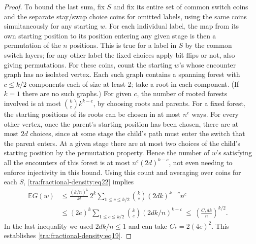 \begin{proof}
To bound the last sum, fix \(S\) and fix its entire set of common switch coins and the separate stay/swap choice coins for omitted labels, using the same coins simultaneously for any starting \(w\). For each individual label, the map from its own starting position to its position entering any given stage is then a permutation of the \(n\) positions. This is true for a label in \(S\) by the common switch layers; for any other label the fixed choices apply bit flips or not, also giving permutations. For these coins, count the starting \(w\)'s whose encounter graph has no isolated vertex. Each such graph contains a spanning forest with \(c\le k/2\) components each of size at least 2; take a root in each component. (If \(k=1\) there are no such graphs.) For given \(c\), the number of rooted forests involved is at most
\(\binom{k}{c} k^{k-c}\), by choosing roots and parents. For a fixed forest, the starting positions of its roots can be chosen in at most \(n^c\) ways. For every other vertex, once the parent's starting position has been chosen, there are at most \(2d\) choices, since at some stage the child's path must enter the switch that the parent enters. At a given stage there are at most two choices of the child's starting position by the permutation property. Hence the number of \(w\)'s satisfying all the encounters of this forest is at most \(n^c(2d)^{k-c}\), not even needing to enforce injectivity in this bound. Using this count and averaging over coins for each \(S\), \eqref{tra:fractional-density:eq22} implies
\[
 \begin{aligned}
 \mathbb E G(w)
 &\le \frac{(k/n)^k}{k!}\,2^k
  \sum_{1\le c\le k/2} \binom{k}{c} (2d k)^{k-c} n^c\\
 &\le (2e)^k \sum_{1\le c\le k/2} \binom{k}{c} (2d k/n)^{k-c}
 \ \le\ \left(\frac{C_* d k}{n}\right)^{k/2}.
 \end{aligned}
\]
In the last inequality we used \(2dk/n\le 1\) and can take \(C_*=2(4e)^2\). This establishes \eqref{tra:fractional-density:eq19}.

\end{proof}

